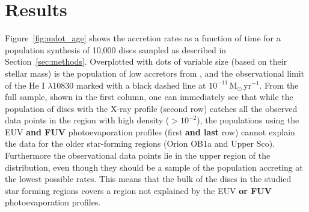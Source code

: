 \documentclass[fleqn,usenatbib]{mnras}
\begin{document}
\section{Results}\label{sec:results}

Figure~\ref{fig:mdot_age} shows the accretion rates as a function of time for a population synthesis of 10,000 discs sampled as described in Section~\ref{sec:methods}.
Overplotted with dots of variable size (based on their stellar mass) is the population of low accretors from , and the observational limit of the He I $\lambda10830$ marked with a black dashed line at $10^{-11}$\,M$_\odot$\,yr$^{-1}$.
From the full sample, shown in the first column, one can immediately see that while the population of discs with the X-ray profile (second row) catches all the observed data points in the region with high density ($> 10^{-2}$), the populations using the EUV \textbf{and FUV} photoevaporation profiles (first \textbf{and last} row) cannot explain the data for the older star-forming regions (Orion OB1a and Upper Sco). Furthermore the observational data points lie in the upper region of the distribution, even though they should be a sample of the population accreting at the lowest possible rates. This means that the bulk of the discs in the studied star forming regions covers a region not explained by the EUV \textbf{or FUV} photoevaporation profiles.
\end{document}
